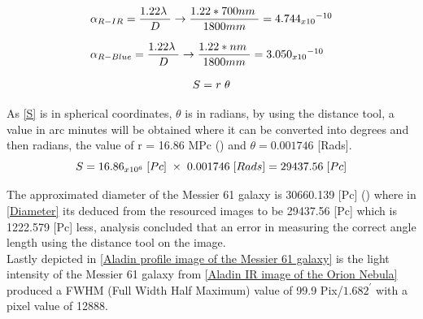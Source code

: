 \documentclass[12pt]{article}
\begin{document}
\begin{equation}
\begin{array}{l}
    {\alpha}_{R-IR} = \dfrac{1.22 \hspace{0.1cm \lambda}}{D} \rightarrow \dfrac{1.22 \hspace{0.1cm * 700nm}}{1800mm} = 4.744{_{x10}}^{-10} \\ [0.5cm]
    {\alpha}_{R-Blue} = \dfrac{1.22 \hspace{0.1cm \lambda}}{D} \rightarrow \dfrac{1.22 \hspace{0.1cm * nm}}{1800mm} = 3.050{_{x10}}^{-10}
\end{array}
\label{rayleighs}
\end{equation}
\vspace{0.3cm}

\begin{equation}
S = r \hspace{0.1cm} \theta
\label{S}
\end{equation}
\vspace{0.2cm}

As \cref{S} is in spherical coordinates, $\theta$ is in radians, by using the distance tool, a value in arc minutes will be obtained where it can be converted into degrees and then radians, the value of r = 16.86 MPc (\cite{Distance}) and $\theta = 0.001746$ [Rads]. \\

\begin{equation}
S = {16.86}_{{x10}^6} \hspace{0.1cm} [Pc] \hspace{0.1cm} \times \hspace{0.1cm} 0.001746 \hspace{0.1cm}[Rads] = 29437.56 \hspace{0.1cm} [Pc]
\label{Diameter}
\end{equation}
\vspace{0.2cm}

The approximated diameter of the Messier 61 galaxy is 30660.139 [Pc] (\cite{Diameter}) where in \cref{Diameter} its deduced from the resourced images to be 29437.56 [Pc] which is 1222.579 [Pc] less, analysis concluded that an error in measuring the correct angle length using the distance tool on the image. \\

Lastly depicted in \cref{Aladin profile image of the Messier 61 galaxy} is the light intensity of the Messier 61 galaxy from \cref{Aladin IR image of the Orion Nebula} produced a FWHM (Full Width Half Maximum) value of 99.9 Pix/$1.682^{\prime}$ with a pixel value of 12888. 
\end{document}
